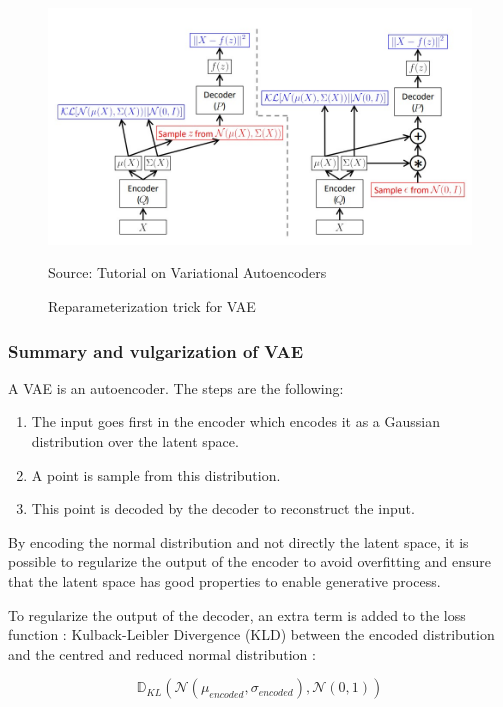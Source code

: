 \documentclass[12pt]{report}
\begin{document}
\begin{figure}[htbp]
    \centering
    \includegraphics[width=\textwidth]{images/nn/architectures/reparameterization-trick.jpg}
    \caption{Reparameterization trick for VAE}
    Source: Tutorial on Variational Autoencoders \cite{doersch_tutorial_2016}
    \label{fig:vae:reparameterization-trick}
\end{figure}

\subsubsection{Summary and vulgarization of VAE}

A VAE  is an autoencoder. The steps are the following:
\begin{enumerate}
    \item The input goes first in the encoder which encodes it as a Gaussian distribution over the latent space.
    \item A point is sample from this distribution.
    \item This point is decoded by the decoder to reconstruct the input.
\end{enumerate}

By encoding the normal distribution and not directly the latent space, it is possible to regularize the output of the encoder to avoid overfitting and ensure that the latent space has good properties to enable generative process.

To regularize the output of the decoder, an extra term is added to the loss function : Kulback-Leibler Divergence (KLD) between the encoded distribution and the centred and reduced normal distribution :

\begin{equation}
    \mathbb{D}_{KL} (\mathcal{N}(\mu_{encoded}, \sigma_{encoded}), \mathcal{N}(0, 1))
\end{equation}
\end{document}
